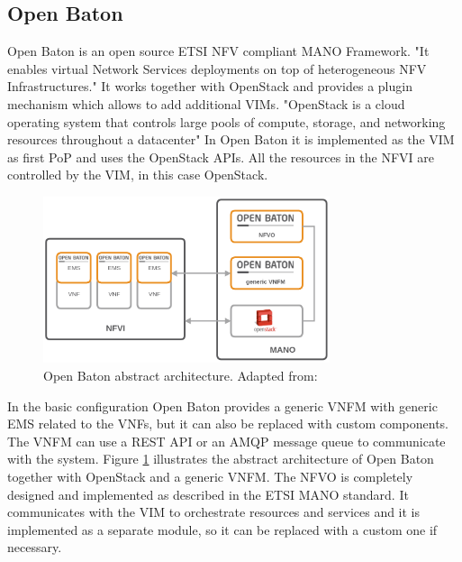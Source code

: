 \subsection{Open Baton}
Open Baton is an open source \ac{ETSI} \ac{NFV} compliant \ac{MANO} Framework\cite[cf.]{openBatonDoc}.
"It enables virtual Network Services deployments on top of heterogeneous \ac{NFV} Infrastructures."\cite{openBatonDoc}
It works together with OpenStack and provides a plugin mechanism which allows to add additional \acp{VIM}.\cite[cf.]{openBatonDoc}
"OpenStack is a cloud operating system that controls large pools of compute, storage, and networking resources throughout a datacenter"\cite{OpenStackDoc}
In Open Baton it is implemented as the \ac{VIM} as first \ac{PoP} and uses the OpenStack \acp{API}.\cite{openBatonDoc}
All the resources in the \ac{NFVI} are controlled by the \ac{VIM}, in this case OpenStack.

\begin{figure}[H]
    \centering
    \includegraphics[width=0.75\textwidth]{resources/images/open_baton_simple_architecture.png}
    \caption[Open Baton abstract architecture]{Open Baton abstract architecture. Adapted from: \cite{openBatonDoc}}
    \label{fig:open_baton_abstract_architecture}
\end{figure}

In the basic configuration Open Baton provides a generic \ac{VNFM} with generic \ac{EMS} related to the \acp{VNF}, but it can also be replaced with custom components.
The \ac{VNFM} can use a \ac{REST} \ac{API} or an \ac{AMQP} message queue to communicate with the system.
Figure \ref{fig:open_baton_abstract_architecture} illustrates the abstract architecture of Open Baton together with OpenStack and a generic \ac{VNFM}.
The \ac{NFVO} is completely designed and implemented as described in the \ac{ETSI} \ac{MANO} standard.\cite{openBatonDoc}
It communicates with the \ac{VIM} to orchestrate resources and services and it is implemented as a separate module, so it can be replaced with a custom one if necessary.

